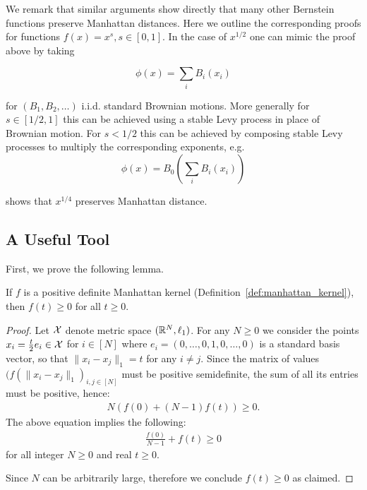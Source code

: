 We remark that similar arguments show directly that many other Bernstein functions preserve Manhattan distances. Here we outline the corresponding proofs for functions $f(x)=x^s,s\in [0,1]$. In the case of $x^{1/2}$ one can mimic the proof above by taking 

\[\phi(x)=\sum_i B_i(x_i)\]

for $(B_1,B_2,\dots)$ i.i.d. standard Brownian motions. More generally for $s\in [1/2,1]$ this can be achieved using a stable Levy process in place of Brownian motion. For $s<1/2$ this can be achieved by composing stable Levy processes to multiply the corresponding exponents, e.g. 
\[
\phi(x)=B_0\left(\sum_i B_i(x_i)\right) 
\]

shows that $x^{1/4}$ preserves Manhattan distance. 

\fi

\subsection{A Useful Tool}\label{sec:bern:tool} 

First, we prove the following lemma.
\begin{lemma}

\label{lem:monotonepositive}

If $f$ is a positive definite Manhattan kernel (Definition~\ref{def:manhattan_kernel}), then $f(t)\geq 0$ for all $t\geq 0$.

\end{lemma}

\begin{proof}

Let ${\cal X}$ denote metric space $({\mathbb R}^N, \ell_1)$.  For any $N \geq 0$ we consider the points $x_i=\frac{t}{2}e_i\in {\cal X}$ for $i\in [N]$ where $e_i=(0,\dots,0,1,0,\dots,0)$ is a standard basis vector, so that $\|x_i-x_j\|_1=t$ for any $i\neq j$. Since the matrix of values $(f(\|x_i - x_j\|_1)_{i,j\in [N]}$ must be positive semidefinite, the sum of all its entries must be positive, hence:
\begin{align*}
N(f(0)+(N-1)f(t))\geq 0.
\end{align*}
The above equation implies the following:
\begin{align*}
\frac{f(0)}{N-1}+f(t)\geq 0
\end{align*}
for all integer $N \geq 0$ and real $t \geq 0$. 

Since $N$ can be arbitrarily large, therefore we conclude $f(t)\geq 0$ as claimed.

\end{proof}


